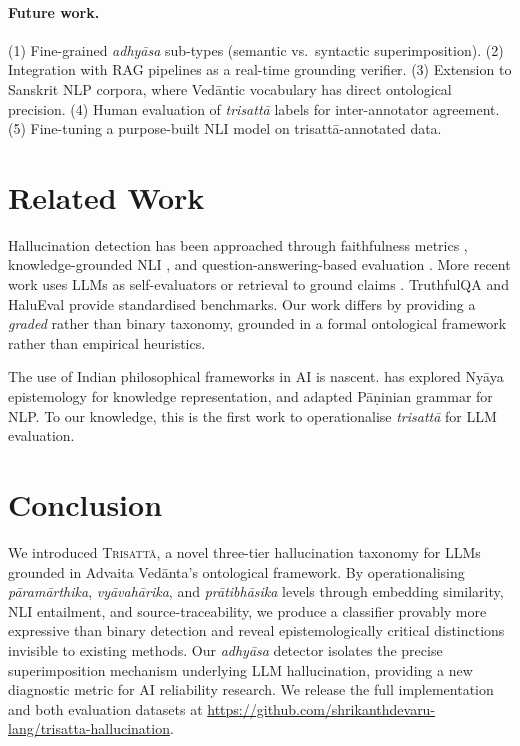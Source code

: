 \documentclass[11pt]{article}
\newcommand{\param}{\textcolor{paramcol}{\textit{pāramārthika}}}
\newcommand{\vyav}{\textcolor{vyavcol}{\textit{vyāvahārika}}}
\newcommand{\prati}{\textcolor{praticol}{\textit{prātibhāsika}}}
\newcommand{\adhyasa}{\textcolor{adhyasacol}{\textit{adhyāsa}}}
\newcommand{\trisatta}{\textit{trisattā}}
\newcommand{\system}{\textsc{Trisatt\={a}}}
\begin{document}
\paragraph{Future work.}
(1) Fine-grained \adhyasa{} sub-types (semantic vs.\ syntactic superimposition).
(2) Integration with RAG pipelines as a real-time grounding verifier.
(3) Extension to Sanskrit NLP corpora, where Vedāntic vocabulary has direct
ontological precision.
(4) Human evaluation of \trisatta{} labels for inter-annotator agreement.
(5) Fine-tuning a purpose-built NLI model on trisattā-annotated data.

\section{Related Work}
\label{sec:related}

Hallucination detection has been approached through faithfulness metrics
\cite{maynez2020faithfulness}, knowledge-grounded NLI \cite{honovich2022true},
and question-answering-based evaluation \cite{fabbri2021qafacteval}. More recent
work uses LLMs as self-evaluators \cite{manakul2023selfcheckgpt} or retrieval to
ground claims \cite{shi2023replug}. TruthfulQA \cite{lin2022truthfulqa} and
HaluEval \cite{halueval2023} provide standardised benchmarks. Our work differs
by providing a \emph{graded} rather than binary taxonomy, grounded in a formal
ontological framework rather than empirical heuristics.

The use of Indian philosophical frameworks in AI is nascent. \citet{ganeri2020}
has explored Ny\={a}ya epistemology for knowledge representation, and
\citet{bharati1996paninian} adapted P\={a}\d{n}inian grammar for NLP.
To our knowledge, this is the first work to operationalise \trisatta{} for
LLM evaluation.

\section{Conclusion}
\label{sec:conclusion}

We introduced \system{}, a novel three-tier hallucination taxonomy for LLMs
grounded in Advaita Ved\={a}nta's ontological framework. By operationalising
\param{}, \vyav{}, and \prati{} levels through embedding similarity, NLI
entailment, and source-traceability, we produce a classifier provably more
expressive than binary detection and reveal epistemologically critical
distinctions invisible to existing methods. Our \adhyasa{} detector isolates the
precise superimposition mechanism underlying LLM hallucination, providing a new
diagnostic metric for AI reliability research. We release the full
implementation and both evaluation datasets at
\url{https://github.com/shrikanthdevaru-lang/trisatta-hallucination}.
\end{document}
